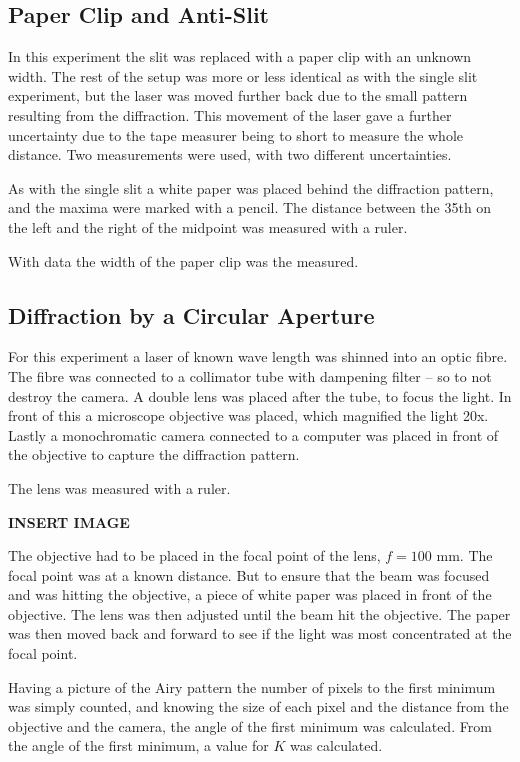 \documentclass{emulateapj}
\begin{document}
\subsection{Paper Clip and Anti-Slit}
In this experiment the slit was replaced with a paper clip with an unknown width. The rest of the setup was more or less identical as with the single slit experiment, but the laser was moved further back due to the small pattern resulting from the diffraction. This movement of the laser gave a further uncertainty due to the tape measurer being to short to measure the whole distance. Two measurements were used, with two different uncertainties.

As with the single slit a white paper was placed behind the diffraction pattern, and the maxima were marked with a pencil. The distance between the 35th on the left and the right of the midpoint was measured with a ruler.

With data the width of the paper clip was the measured.

\subsection{Diffraction by a Circular Aperture}
For this experiment a laser of known wave length was shinned into an optic fibre. The fibre was connected to a collimator tube with dampening filter -- so to not destroy the camera. A double lens was placed after the tube, to focus the light. In front of this a microscope objective was placed, which magnified the light 20x. Lastly a monochromatic camera connected to a computer was placed in front of the objective to capture the diffraction pattern.

The lens was measured with a ruler.

\textbf{INSERT IMAGE}

The objective had to be placed in the focal point of the lens, $f = 100$ mm. The focal point was at a known distance. But to ensure that the beam was focused and was hitting the objective, a piece of white paper was placed in front of the objective. The lens was then adjusted until the beam hit the objective. The paper was then moved back and forward to see if the light was most concentrated at the focal point. 

Having a picture of the Airy pattern the number of pixels to the first minimum was simply counted, and knowing the size of each pixel and the distance from the objective and the camera, the angle of the first minimum was calculated. From the angle of the first minimum, a value for $K$ was calculated.
\end{document}
